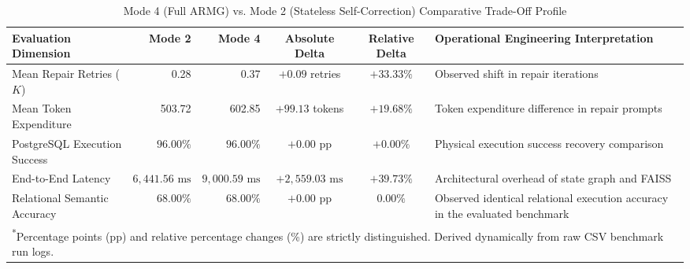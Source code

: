 \begin{table}[t]
\centering
\caption{Mode 4 (Full ARMG) vs. Mode 2 (Stateless Self-Correction) Comparative Trade-Off Profile}
\label{tab:tradeoff}
\begin{tabular}{lrrccp{5.5cm}}
\hline
\textbf{Evaluation Dimension} & \textbf{Mode 2} & \textbf{Mode 4} & \textbf{Absolute Delta} & \textbf{Relative Delta} & \textbf{Operational Engineering Interpretation} \\
\hline
Mean Repair Retries ($K$) & 0.28 & 0.37 & $+0.09$ retries & $+33.33\%$ & Observed shift in repair iterations \\
Mean Token Expenditure & 503.72 & 602.85 & $+99.13$ tokens & $+19.68\%$ & Token expenditure difference in repair prompts \\
PostgreSQL Execution Success & $96.00\%$ & $96.00\%$ & $+0.00\text{ pp}$ & $+0.00\%$ & Physical execution success recovery comparison \\
End-to-End Latency & $6,441.56\text{ ms}$ & $9,000.59\text{ ms}$ & $+2,559.03\text{ ms}$ & $+39.73\%$ & Architectural overhead of state graph and FAISS \\
Relational Semantic Accuracy & $68.00\%$ & $68.00\%$ & $+0.00\text{ pp}$ & $0.00\%$ & Observed identical relational execution accuracy in the evaluated benchmark \\
\hline
\multicolumn{6}{l}{\footnotesize \textsuperscript{*}Percentage points (pp) and relative percentage changes (\%) are strictly distinguished. Derived dynamically from raw CSV benchmark run logs.} \\
\end{tabular}
\end{table}
